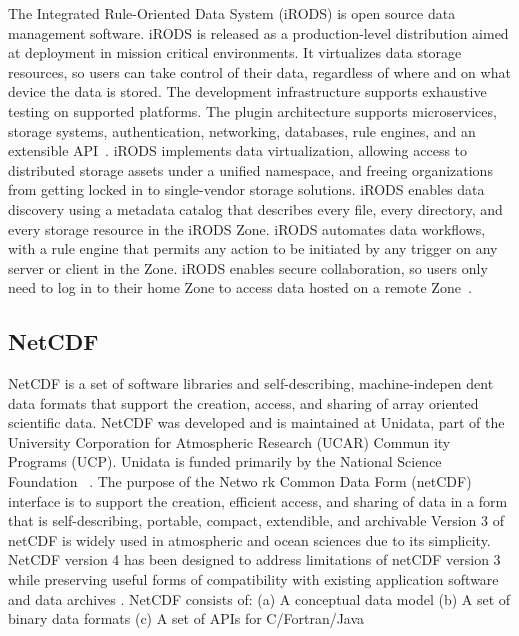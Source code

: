 The Integrated Rule-Oriented Data System (iRODS) is open source data
management software. iRODS is released as a production-level
distribution aimed at deployment in mission critical environments. It
virtualizes data storage resources, so users can take control of their
data, regardless of where and on what device the data is stored. The
development infrastructure supports exhaustive testing on supported
platforms. The plugin architecture supports microservices, storage
systems, authentication, networking, databases, rule engines, and an
extensible API~\cite{irods-www}.  iRODS implements data
virtualization, allowing access to distributed storage assets under a
unified namespace, and freeing organizations from getting locked in to
single-vendor storage solutions. iRODS enables data discovery using a
metadata catalog that describes every file, every directory, and every
storage resource in the iRODS Zone. iRODS automates data workflows,
with a rule engine that permits any action to be initiated by any
trigger on any server or client in the Zone. iRODS enables secure
collaboration, so users only need to log in to their home Zone to
access data hosted on a remote Zone~\cite{github-irods-www}.

     \pv


\subsection{NetCDF}

NetCDF is a set of software libraries and self-describing,
machine-indepen dent data formats that support the creation, access,
and sharing of array oriented scientific data. NetCDF was developed
and is maintained at Unidata, part of the University Corporation for
Atmospheric Research (UCAR) Commun ity Programs (UCP). Unidata is
funded primarily by the National Science Foundation
\cite{paper-netCDF}~\cite{www-netcdf}. The purpose of the Netwo rk
Common Data Form (netCDF) interface is to support the creation,
efficient access, and sharing of data in a form that is
self-describing, portable, compact, extendible, and archivable Version
3 of netCDF is widely used in atmospheric and ocean sciences due to
its simplicity. NetCDF version 4 has been designed to address
limitations of netCDF version 3 while preserving useful forms of
compatibility with existing application software and data archives
\cite{paper-netCDF}.  NetCDF consists of: (a) A conceptual data model
(b) A set of binary data formats (c) A set of APIs for C/Fortran/Java

